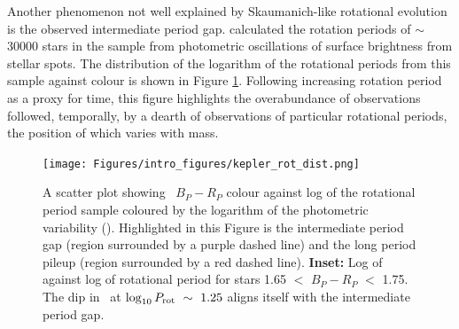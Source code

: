 Another phenomenon not well explained by Skaumanich-like rotational evolution is the observed intermediate period gap.
\citet{mcquillan_rotation_2014} calculated the rotation periods of $\sim$30000 stars in the \kepler{} sample from photometric oscillations of surface brightness from stellar spots.
The distribution of the logarithm of the rotational periods from this sample against colour is shown in Figure \ref{fig:kepler_rot_period}. 
Following increasing rotation period as a proxy for time, this figure highlights the overabundance of observations followed, temporally, by a dearth of observations of particular rotational periods, the position of which varies with mass.

\begin{figure}[h]
    \texttt{[image: Figures/intro\_figures/kepler\_rot\_dist.png]}
    \caption[The rotational period distribution of the \citet{mcquillan_rotation_2014} sample highlighting the intermediate period gap and long period pileup.]{A scatter plot showing \GDRT \ $B_P-R_P$ colour against log of the \kepler{} \citet{mcquillan_rotation_2014} rotational period sample coloured by the logarithm of the photometric variability (\rper). Highlighted in this Figure is the intermediate period gap (region surrounded by a purple dashed line) and the long period pileup (region surrounded by a red dashed line). \textbf{Inset:} Log of \rper{} against log of rotational period for stars 1.65 $<$ $B_P - R_P$ $<$ 1.75.  The dip in \rper\ at $\log_{10} P_{\rm{rot}} \ \sim\ 1.25$ aligns itself with the intermediate period gap.
    }
    \label{fig:kepler_rot_period}
\end{figure}

